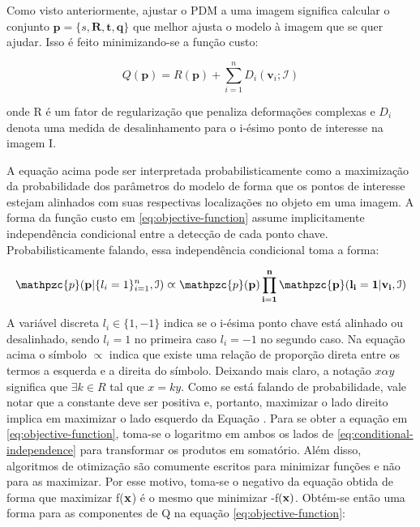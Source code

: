 {Como visto anteriormente, ajustar o PDM a uma imagem significa calcular o
conjunto $\mathbf{p} = \{s, \mathbf{R}, \mathbf{t}, \mathbf{q}\}$ que melhor ajusta o modelo à imagem que se quer
ajudar. Isso é feito minimizando-se a função custo:

\begin{equation}
\label{eq:objective-function}
Q(\mathbf{p}) = R(\mathbf{p}) + \sum_{i=1}^n D_i(\mathbf{v}_i; \mathcal{I})
\end{equation}

onde R é um fator de regularização que penaliza deformações complexas e $D_i$
denota uma medida de desalinhamento para o i-ésimo ponto de interesse na imagem
I\cite{facetracker}.

A equação acima pode ser interpretada probabilisticamente como a maximização
da probabilidade dos parâmetros do modelo de forma que os pontos de interesse
estejam alinhados com suas respectivas localizações no objeto em uma imagem\cite{facetracker}. A forma da função custo em \ref{eq:objective-function} assume implicitamente independência condicional entre a detecção de cada ponto chave. Probabilisticamente falando, essa independência condicional toma a forma:

\begin{equation}
\label{eq:conditional-independence}
\mathpzc{p}(\mathbf{p} | \{l_i = 1\}_{i=1}^n, \mathcal{I}) \varpropto \mathpzc{p}(\bf{p}) \prod_{i=1}^n \mathpzc{p}(l_i = 1 | \mathbf{v}_i, \mathcal{I})
\end{equation}

A variável discreta $l_i \in \{1, -1\}$ indica se o i-ésima ponto chave está alinhado ou desalinhado, sendo $l_i=1$ no primeira caso $l_i=-1$ no segundo caso. Na equação acima o símbolo $\varpropto$ indica que existe uma relação de proporção direta entre os termos a esquerda e a direita do símbolo. Deixando mais claro, a notação $x \alpha y$ significa que $\exists k \in R$ tal que $x = k y$. Como se está falando de probabilidade, vale notar que a constante
deve ser positiva e, portanto, maximizar o lado direito implica em maximizar o
lado esquerdo da Equação \label{eq:conditional-independence}.  Para se obter a equação em \ref{eq:objective-function}, toma-se
o logaritmo em ambos os lados de \ref{eq:conditional-independence} para transformar os produtos em
somatório. Além disso, algoritmos de otimização são comumente escritos para
minimizar funções e não para as maximizar. Por esse motivo, toma-se o negativo
da equação obtida de forma que maximizar f($\bf{x}$) é o mesmo que minimizar
-f$(\bf{x})$. Obtém-se então uma forma para as componentes de Q na equação \ref{eq:objective-function}:

}
